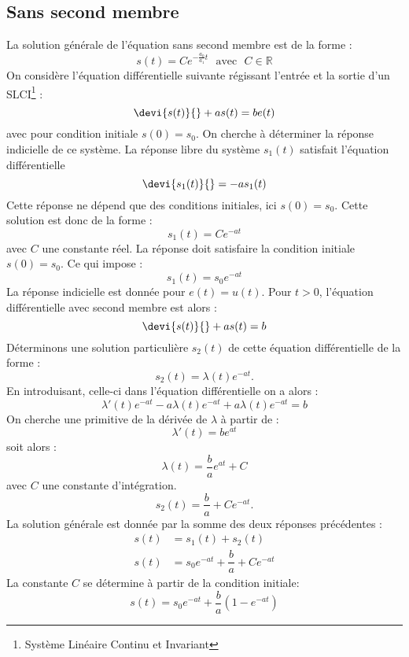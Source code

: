 \subsection{Sans second membre}
La solution générale de l'équation sans second membre est de la forme :
\[
s(t) = C e^{-\frac{a_0}{a_1}t}\,\,\,\,\text{avec}\,\,\,\,C\in\mathbb{R}
\]
On considère l'équation différentielle suivante régissant l'entrée
et la sortie d'un SLCI\footnote{Système Linéaire Continu et Invariant} :
\[
\devi{s(t)}{}+as(t)=be(t)
\]
avec pour condition initiale $s(0)=s_0$.
On cherche à déterminer la réponse indicielle de ce système.
La réponse libre du système $s_1(t)$ satisfait l'équation différentielle
\[
\devi{s_1(t)}{}=-as_1(t)
\]
Cette réponse ne dépend que des conditions initiales, ici $s(0)=s_0$.
Cette solution est donc de la forme :
\[
s_1(t)=Ce^{-at}
\]
avec $C$ une constante réel. La réponse doit satisfaire la condition 
initiale $s(0)=s_0$. Ce qui impose :
\[
s_1(t)=s_0e^{-at}
\]
La réponse indicielle est donnée pour $e(t)=u(t)$. Pour $t>0$, l'équation 
différentielle avec second membre est alors :
\[
\devi{s(t)}{}+as(t)=b
\]
Déterminons une solution particulière $s_2(t)$ de cette équation 
différentielle de la forme :
\[
s_2(t)=\lambda(t)e^{-at}.
\]
En introduisant, celle-ci dans l'équation différentielle on a alors :
\[
\lambda'(t)e^{-at}-a\lambda(t)e^{-at}+a\lambda(t)e^{-at}=b
\]
On cherche une primitive de la dérivée de $\lambda$ à partir de :
\[
\lambda'(t)=be^{at}
\]
soit alors :
\[
\lambda(t)=\dfrac{b}{a}e^{at}+C
\]
avec $C$ une constante d'intégration.
\[
s_2(t)=\dfrac{b}{a}+Ce^{-at}.
\]
La solution générale est donnée par la somme des deux réponses précédentes :
\begin{align*}
    s(t)&=s_1(t)+s_2(t)\\
    s(t)&=s_0e^{-at}+\dfrac{b}{a}+Ce^{-at}
\end{align*}
La constante $C$ se détermine à partir de la condition initiale:
\[
s(t)=s_0e^{-at}+\dfrac{b}{a}\left(1-e^{-at}\right)
\]
\begin{center}
    
\end{center}
